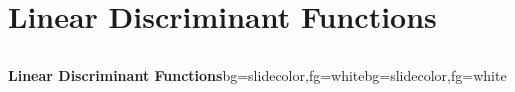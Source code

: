 \section{Linear Discriminant Functions}
\subsection{}
\begin{frame}{}
\begin{variableblock}{\centering \Large \textbf{\vspace{4pt}\newline Linear Discriminant Functions\vspace{4pt}}}{bg=slidecolor,fg=white}{bg=slidecolor,fg=white}
\end{variableblock}
\end{frame}




